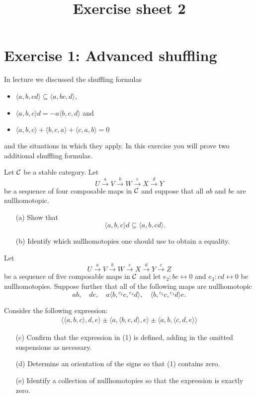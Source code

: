 \documentclass[reqno]{amsart}
\title{Exercise sheet 2}
\begin{document}
\maketitle

\section*{\bf Exercise 1: Advanced shuffling}

In lecture we discussed the shuffling formulas
\begin{itemize}
\item $\langle a,b,cd \rangle \subseteq \langle a,bc,d \rangle$,
\item $\langle a,b,c \rangle d = -a \langle b,c,d \rangle$ and
\item $\langle a,b,c \rangle + \langle b,c,a \rangle + \langle c,a,b \rangle = 0$
\end{itemize}
and the situations in which they apply.
In this exercise you will prove two additional shuffling formulas.

Let $\mathcal{C}$ be a stable category.
Let
\[ U \xrightarrow{a} V \xrightarrow{b} W \xrightarrow{c} X \xrightarrow{d} Y \]
be a sequence of four composable maps in $\mathcal{C}$ and
suppose that all $ab$ and $bc$ are nullhomotopic.

\begin{enumerate}
\item[(a)] Show that
  \[ \langle a,b,c \rangle d \subseteq \langle a,b,cd \rangle. \]
\item[(b)] Identify which nullhomotopies one should use to obtain a equality.
\end{enumerate}

Let
\[ U \xrightarrow{a} V \xrightarrow{b} W \xrightarrow{c} X \xrightarrow{d} Y \xrightarrow{e} Z \]
be a sequence of five composable maps in $\mathcal{C}$ and
let $e_2 : bc \leftrightarrow 0$ and $e_3 : cd \leftrightarrow 0 $ be nullhomotopies.
Suppose further that all of the following maps are nullhomotopic
\[ ab,\quad de,\quad a  \langle b,{}^{e_2} c,{}^{e_3} d \rangle,\quad \langle b,{}^{e_2} c,{}^{e_3} d \rangle e. \]

Consider the following expression:
\begin{align}
  \langle \langle a, b, c \rangle, d, e \rangle \pm \langle a, \langle b, c, d \rangle, e \rangle \pm \langle a, b, \langle c, d, e \rangle \rangle
\end{align}

\begin{enumerate}
\item[(c)] Confirm that the expression in (1) is defined,
  adding in the omitted suspensions as necessary.
\item[(d)] Determine an orientation of the signs so that (1) contains zero.
\item[(e)] Identify a collection of nullhomotopies so that the expression is exactly zero.
\end{enumerate}
\end{document}
